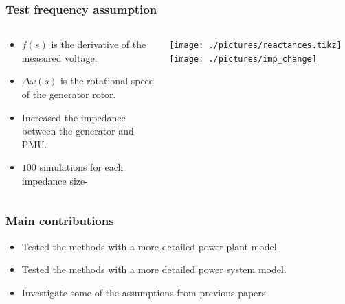 \begin{frame}
	\frametitle{Test frequency assumption}
	\begin{columns}
		\begin{column}{0.3\textwidth}
			\begin{itemize}
				\item $f(s)$ is the derivative of the measured voltage.
				\item $\Delta \omega(s)$ is the rotational speed of the generator rotor.
				\item Increased the impedance between the generator and PMU.
				\item $100$ simulations for each impedance size-
			\end{itemize}
		\end{column}
		\begin{column}{0.7\textwidth}
			\texttt{[image: ./pictures/reactances.tikz]}
			\texttt{[image: ./pictures/imp\_change]}
		\end{column}
	\end{columns}
\end{frame}
\begin{frame}
	\frametitle{Main contributions}
	\begin{itemize}
		\item Tested the methods with a more detailed power plant model.
		\item Tested the methods  with a more detailed power system model.
		\item Investigate some of the assumptions from previous papers.
	\end{itemize}
\end{frame}

